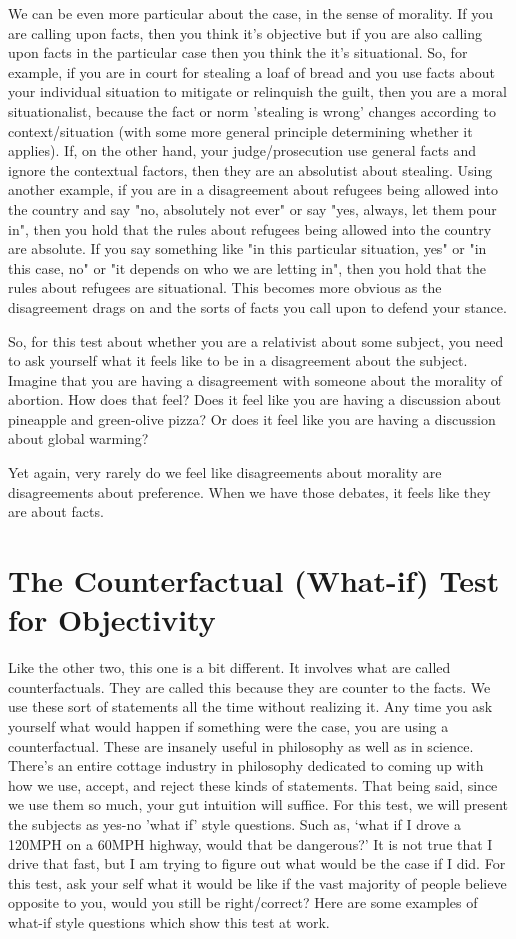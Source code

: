 We can be even more particular about the case, in the sense of morality. If you are calling upon facts, then you think it's objective but if you are also calling upon facts in the particular case then you think the it's situational. So, for example, if you are in court for stealing a loaf of bread and you use facts about your individual situation to mitigate or relinquish the guilt, then you are a moral situationalist, because the fact or norm 'stealing is wrong' changes according to context/situation (with some more general principle determining whether it applies). If, on the other hand, your judge/prosecution use general facts and ignore the contextual factors, then they are an absolutist about stealing. Using another example, if you are in a disagreement about refugees being allowed into the country and say "no, absolutely not ever" or say "yes, always, let them pour in", then you hold that the rules about refugees being allowed into the country are absolute. If you say something like "in this particular situation, yes" or "in this case, no" or "it depends on who we are letting in", then you hold that the rules about refugees are situational. This becomes more obvious as the disagreement drags on and the sorts of facts you call upon to defend your stance.  

So, for this test about whether you are a relativist about some subject, you need to ask yourself what it feels like to be in a disagreement about the subject. Imagine that you are having a disagreement with someone about the morality of abortion. How does that feel? Does it feel like you are having a discussion about pineapple and green-olive pizza? Or does it feel like you are having a discussion about global warming?

Yet again, very rarely do we feel like disagreements about morality are disagreements about preference. When we have those debates, it feels like they are about facts.

\section{The Counterfactual (What-if) Test for Objectivity}

Like the other two, this one is a bit different. It involves what are called counterfactuals. They are called this because they are counter to the facts. We use these sort of statements all the time without realizing it. Any time you ask yourself what would happen if something were the case, you are using a counterfactual. These are insanely useful in philosophy as well as in science. There's an entire cottage industry in philosophy dedicated to coming up with how we use, accept, and reject these kinds of statements. That being said, since we use them so much, your gut intuition will suffice. For this test, we will present the subjects as yes-no 'what if' style questions. Such as, ‘what if I drove a 120MPH on a 60MPH highway, would that be dangerous?’ It is not true that I drive that fast, but I am trying to figure out what would be the case if I did. For this test, ask your self what it would be like if the vast majority of people believe opposite to you, would you still be right/correct? Here are some examples of what-if style questions which show this test at work.

